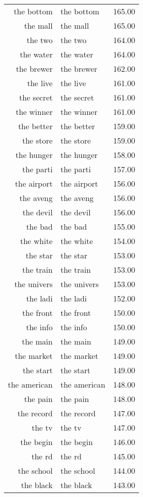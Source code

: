 \begin{table}[ht]
\begin{tabular}{rlr}
  the bottom & the bottom & 165.00 \\ 
  the mall & the mall & 165.00 \\ 
  the two & the two & 164.00 \\ 
  the water & the water & 164.00 \\ 
  the brewer & the brewer & 162.00 \\ 
  the live & the live & 161.00 \\ 
  the secret & the secret & 161.00 \\ 
  the winner & the winner & 161.00 \\ 
  the better & the better & 159.00 \\ 
  the store & the store & 159.00 \\ 
  the hunger & the hunger & 158.00 \\ 
  the parti & the parti & 157.00 \\ 
  the airport & the airport & 156.00 \\ 
  the aveng & the aveng & 156.00 \\ 
  the devil & the devil & 156.00 \\ 
  the bad & the bad & 155.00 \\ 
  the white & the white & 154.00 \\ 
  the star & the star & 153.00 \\ 
  the train & the train & 153.00 \\ 
  the univers & the univers & 153.00 \\ 
  the ladi & the ladi & 152.00 \\ 
  the front & the front & 150.00 \\ 
  the info & the info & 150.00 \\ 
  the main & the main & 149.00 \\ 
  the market & the market & 149.00 \\ 
  the start & the start & 149.00 \\ 
  the american & the american & 148.00 \\ 
  the pain & the pain & 148.00 \\ 
  the record & the record & 147.00 \\ 
  the tv & the tv & 147.00 \\ 
  the begin & the begin & 146.00 \\ 
  the rd & the rd & 145.00 \\ 
  the school & the school & 144.00 \\ 
  the black & the black & 143.00 \\ 

\end{tabular}
\end{table}
